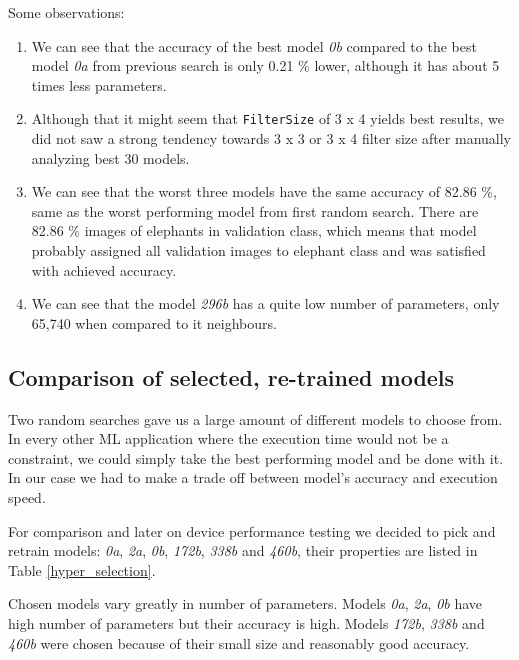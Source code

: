 \clearpage
Some observations:
\begin{enumerate}
    \item We can see that the accuracy of the best model \textit{0b} compared to the best model \textit{0a} from previous search is only 0.21 \% lower, although it has about 5 times less parameters.
    \item Although that it might seem that \verb|FilterSize| of 3 x 4 yields best results, we did not saw a strong tendency towards 3 x 3 or 3 x 4 filter size after manually analyzing best 30 models.
    \item We can see that the worst three models have the same accuracy of 82.86 \%, same as the worst performing model from first random search. There are 82.86 \% images of elephants in validation class, which means that model probably assigned all validation images to elephant class and was satisfied with achieved accuracy.
    \item We can see that the model \textit{296b} has a quite low number of parameters, only 65,740 when compared to it neighbours.
\end{enumerate}


\subsection{ Comparison of selected, re-trained models}
    
Two random searches gave us a large amount of different models to choose from.
In every other ML application where the execution time would not be a constraint, we could simply take the best performing model and be done with it.
In our case we had to make a trade off between model's accuracy and execution speed.

For comparison and later on device performance testing we decided to pick and retrain models: \textit{0a}, \textit{2a}, \textit{0b}, \textit{172b}, \textit{338b} and \textit{460b}, their properties are listed in Table \ref{hyper_selection}.

Chosen models vary greatly in number of parameters.
Models \textit{0a}, \textit{2a}, \textit{0b} have high number of parameters but their accuracy is high.
Models \textit{172b}, \textit{338b} and \textit{460b} were chosen because of their small size and reasonably good accuracy.

